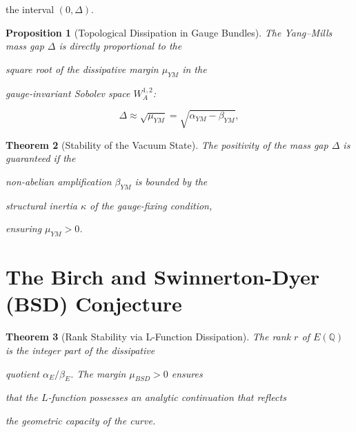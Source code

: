 ﻿\documentclass[11pt,a4paper]{amsart}
\newtheorem{theorem}{Theorem}[section]
\newtheorem{proposition}[theorem]{Proposition}
\newcommand{\alphacoeff}{\ensuremath{\alpha}}
\newcommand{\betacoeff}{\ensuremath{\beta}}
\newcommand{\kappacoeff}{\ensuremath{\kappa}}
\newcommand{\mumargin}{\ensuremath{\mu}}
\begin{document}
the interval $(0, \Delta)$.



\begin{proposition}[Topological Dissipation in Gauge Bundles]

The Yang--Mills mass gap $\Delta$ is directly proportional to the

square root of the dissipative margin $\mumargin_{YM}$ in the

gauge-invariant Sobolev space $W^{1,2}_A$:

\begin{equation}

 \Delta \approx \sqrt{\mumargin_{YM}} = \sqrt{\alphacoeff_{YM} - \betacoeff_{YM}},

\end{equation}

\end{proposition}



\begin{theorem}[Stability of the Vacuum State]

The positivity of the mass gap $\Delta$ is guaranteed if the

non-abelian amplification $\betacoeff_{YM}$ is bounded by the

structural inertia $\kappacoeff$ of the gauge-fixing condition,

ensuring $\mumargin_{YM} > 0$.

\end{theorem}




\section{The Birch and Swinnerton-Dyer (BSD) Conjecture}

\begin{theorem}[Rank Stability via L-Function Dissipation]

The rank $r$ of $E(\mathbb{Q})$ is the integer part of the dissipative

quotient $\alphacoeff_{E} / \betacoeff_{E}$. The margin $\mumargin_{BSD} > 0$ ensures

that the $L$-function possesses an analytic continuation that reflects

the geometric capacity of the curve.

\end{theorem}
\end{document}
